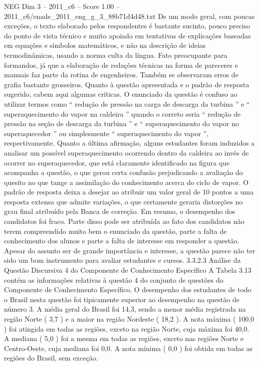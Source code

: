\begin{textsample}{NEG Dim 3 – 2011\_c6 – Score 1.00 – 2011\_c6/enade\_2011\_eng\_g\_3\_88b71d4d48.txt}
De um modo geral, com poucas exceções, o texto elaborado pelos respondentes é bastante sucinto, pouco preciso do ponto de vista técnico e muito apoiado em tentativas de explicações baseadas em equações e símbolos matemáticos, e não na descrição de ideias termodinâmicas, usando a norma culta da língua.
Fato preocupante para formandos, já que a elaboração de redações técnicas na forma de pareceres e manuais faz parte da rotina de engenheiros.
Também se observaram erros de grafia bastante grosseiros.
Quanto à questão apresentada e o padrão de resposta sugerido, cabem aqui algumas críticas.
O enunciado da questão é confuso ao utilizar termos como “ redução de pressão na carga de descarga da turbina ” e “ superaquecimento do vapor na caldeira ” quando o correto seria “ redução de pressão na seção de descarga da turbina ” e “ superaquecimento do vapor no superaquecedor ” ou simplesmente “ superaquecimento do vapor ”, respectivamente.
Quanto a última afirmação, alguns estudantes foram induzidos a analisar um possível superaquecimento ocorrendo dentro da caldeira ao invés de ocorrer no superaquecedor, que está claramente identificado na figura que acompanha a questão, o que gerou certa confusão prejudicando a avaliação do quesito no que tange a assimilação do conhecimento acerca do ciclo de vapor.
O padrão de resposta deixa a desejar ao atribuir um valor geral de 10 pontos a uma resposta extensa que admite variações, o que certamente geraria distorções no grau final atribuído pela Banca de correção.
Em resumo, o desempenho dos candidatos foi fraco.
Parte disso pode ser atribuída ao fato dos candidatos não terem compreendido muito bem o enunciado da questão, parte a falta de conhecimento dos alunos e parte a falta de interesse em responder a questão.
Apesar do assunto ser de grande importância e interesse, a questão parece não ter sido um bom instrumento para avaliar estudantes e cursos. 3.3.2.3 Análise da Questão Discursiva 4 do Componente de Conhecimento Específico A Tabela 3.13 contém as informações relativas à questão 4 do conjunto de questões do Componente de Conhecimento Específico.
O desempenho dos estudantes de todo o Brasil nesta questão foi tipicamente superior ao desempenho na questão de número 3.
A média geral do Brasil foi 14,3, sendo a menor média registrada na região Norte ( 3,7 ) e a maior na região Nordeste ( 18,2 ).
A nota máxima ( 100,0 ) foi atingida em todas as regiões, exceto na região Norte, cuja máxima foi 40,0.
A mediana ( 5,0 ) foi a mesma em todas as regiões, exceto nas regiões Norte e Centro-Oeste, cuja mediana foi 0,0.
A nota mínima ( 0,0 ) foi obtida em todas as regiões do Brasil, sem exceção.

\end{textsample}
